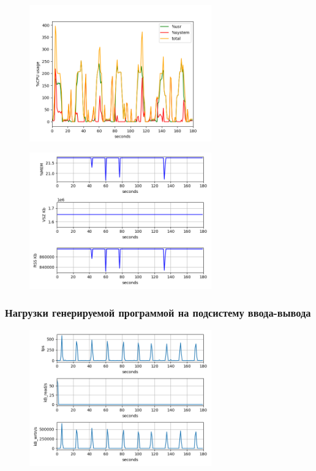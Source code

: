 \documentclass[11pt, a4paper]{article}
\begin{document}
\begin{figure}[h]
  \centering
  \includegraphics[width=0.7\textwidth]{fig-cpu-1.png}
\end{figure}

\begin{figure}[h]
  \centering
  \includegraphics[width=0.7\textwidth]{fig-mem.png}
\end{figure}

\newpage

\subsubsection*{Нагрузки генерируемой программой на подсистему ввода-вывода}

\begin{figure}[h]
  \centering
  \includegraphics[width=0.7\textwidth]{fig-io.png}
\end{figure}
\end{document}
